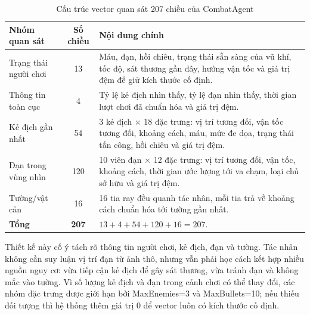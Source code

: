 \begin{table}[H]
    \centering
    \small
    \caption{Cấu trúc vector quan sát 207 chiều của CombatAgent}
    \label{tab:obs_207}
    \begin{tabular}{|p{4cm}|c|p{8cm}|}
        \hline
        \textbf{Nhóm quan sát} & \textbf{Số chiều} & \textbf{Nội dung chính} \\
        \hline
        Trạng thái người chơi & 13 & Máu, đạn, hồi chiêu, trạng thái sẵn sàng của vũ khí, tốc độ, sát thương gần đây, hướng vận tốc và giá trị đệm để giữ kích thước cố định. \\
        \hline
        Thông tin toàn cục & 4 & Tỷ lệ kẻ địch nhìn thấy, tỷ lệ đạn nhìn thấy, thời gian lượt chơi đã chuẩn hóa và giá trị đệm. \\
        \hline
        Kẻ địch gần nhất & 54 & 3 kẻ địch $\times$ 18 đặc trưng: vị trí tương đối, vận tốc tương đối, khoảng cách, máu, mức đe dọa, trạng thái tấn công, hồi chiêu và giá trị đệm. \\
        \hline
        Đạn trong vùng nhìn & 120 & 10 viên đạn $\times$ 12 đặc trưng: vị trí tương đối, vận tốc, khoảng cách, thời gian ước lượng tới va chạm, loại chủ sở hữu và giá trị đệm. \\
        \hline
        Tường/vật cản & 16 & 16 tia ray đều quanh tác nhân, mỗi tia trả về khoảng cách chuẩn hóa tới tường gần nhất. \\
        \hline
        \textbf{Tổng} & \textbf{207} & $13 + 4 + 54 + 120 + 16 = 207$. \\
        \hline
    \end{tabular}
\end{table}


Thiết kế này cố ý tách rõ thông tin người chơi, kẻ địch, đạn và tường. Tác nhân không cần suy luận vị trí đạn từ ảnh thô, nhưng vẫn phải học cách kết hợp nhiều nguồn nguy cơ: vừa tiếp cận kẻ địch để gây sát thương, vừa tránh đạn và không mắc vào tường. Vì số lượng kẻ địch và đạn trong cảnh chơi có thể thay đổi, các nhóm đặc trưng được giới hạn bởi MaxEnemies=3 và MaxBullets=10; nếu thiếu đối tượng thì hệ thống thêm giá trị 0 để vector luôn có kích thước cố định.

